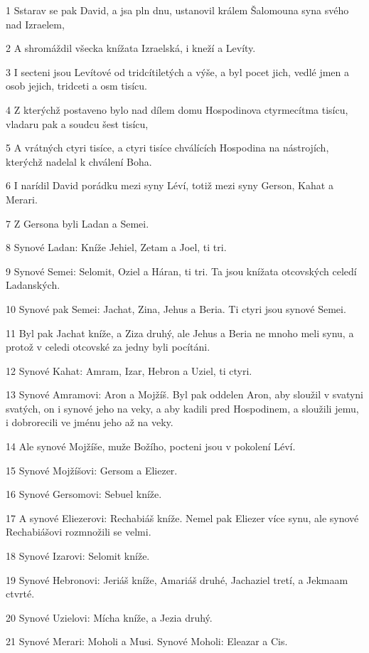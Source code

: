 \par 1 Sstarav se pak David, a jsa pln dnu, ustanovil králem Šalomouna syna svého nad Izraelem,
\par 2 A shromáždil všecka knížata Izraelská, i kneží a Levíty.
\par 3 I secteni jsou Levítové od tridcítiletých a výše, a byl pocet jich, vedlé jmen a osob jejich, tridceti a osm tisícu.
\par 4 Z kterýchž postaveno bylo nad dílem domu Hospodinova ctyrmecítma tisícu, vladaru pak a soudcu šest tisícu,
\par 5 A vrátných ctyri tisíce, a ctyri tisíce chválících Hospodina na nástrojích, kterýchž nadelal k chválení Boha.
\par 6 I narídil David porádku mezi syny Léví, totiž mezi syny Gerson, Kahat a Merari.
\par 7 Z Gersona byli Ladan a Semei.
\par 8 Synové Ladan: Kníže Jehiel, Zetam a Joel, ti tri.
\par 9 Synové Semei: Selomit, Oziel a Háran, ti tri. Ta jsou knížata otcovských celedí Ladanských.
\par 10 Synové pak Semei: Jachat, Zina, Jehus a Beria. Ti ctyri jsou synové Semei.
\par 11 Byl pak Jachat kníže, a Ziza druhý, ale Jehus a Beria ne mnoho meli synu, a protož v celedi otcovské za jedny byli pocítáni.
\par 12 Synové Kahat: Amram, Izar, Hebron a Uziel, ti ctyri.
\par 13 Synové Amramovi: Aron a Mojžíš. Byl pak oddelen Aron, aby sloužil v svatyni svatých, on i synové jeho na veky, a aby kadili pred Hospodinem, a sloužili jemu, i dobrorecili ve jménu jeho až na veky.
\par 14 Ale synové Mojžíše, muže Božího, pocteni jsou v pokolení Léví.
\par 15 Synové Mojžíšovi: Gersom a Eliezer.
\par 16 Synové Gersomovi: Sebuel kníže.
\par 17 A synové Eliezerovi: Rechabiáš kníže. Nemel pak Eliezer více synu, ale synové Rechabiášovi rozmnožili se velmi.
\par 18 Synové Izarovi: Selomit kníže.
\par 19 Synové Hebronovi: Jeriáš kníže, Amariáš druhé, Jachaziel tretí, a Jekmaam ctvrté.
\par 20 Synové Uzielovi: Mícha kníže, a Jezia druhý.
\par 21 Synové Merari: Moholi a Musi. Synové Moholi: Eleazar a Cis.

